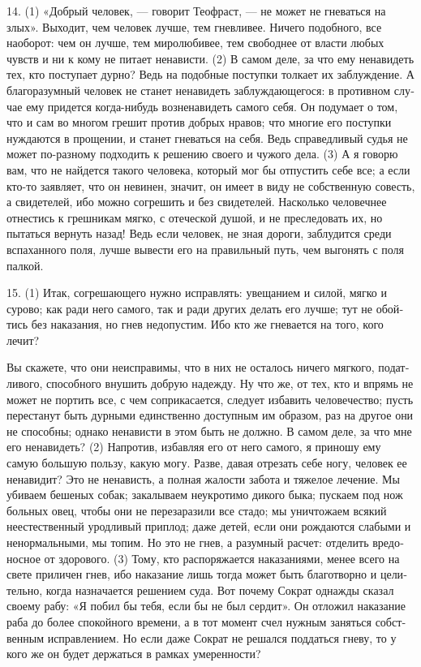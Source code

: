 14. (1) «Доб­рый чело­век, --- гово­рит Тео­фраст, --- не может не гне­вать­ся на злых». Выхо­дит, чем чело­век луч­ше, тем гнев­ли­вее. Ниче­го подоб­но­го, все наобо­рот: чем он луч­ше, тем миро­лю­би­вее, тем сво­бод­нее от вла­сти любых чувств и ни к кому не пита­ет нена­ви­сти. (2) В самом деле, за что ему нена­видеть тех, кто посту­па­ет дур­но? Ведь на подоб­ные поступ­ки тол­ка­ет их заблуж­де­ние. А бла­го­ра­зум­ный чело­век не станет нена­видеть заблуж­даю­ще­го­ся: в про­тив­ном слу­чае ему при­дет­ся когда-нибудь воз­не­на­видеть само­го себя. Он поду­ма­ет о том, что и сам во мно­гом гре­шит про­тив доб­рых нра­вов; что мно­гие его поступ­ки нуж­да­ют­ся в про­ще­нии, и станет гне­вать­ся на себя. Ведь спра­вед­ли­вый судья не может по-раз­но­му под­хо­дить к реше­нию сво­его и чужо­го дела. (3) А я гово­рю вам, что не най­дет­ся тако­го чело­ве­ка, кото­рый мог бы отпу­стить себе все; а если кто-то заяв­ля­ет, что он неви­нен, зна­чит, он име­ет в виду не соб­ст­вен­ную совесть, а свиде­те­лей, ибо мож­но согре­шить и без свиде­те­лей. Насколь­ко чело­веч­нее отне­стись к греш­ни­кам мяг­ко, с оте­че­ской душой, и не пре­сле­до­вать их, но пытать­ся вер­нуть назад! Ведь если чело­век, не зная доро­ги, заблудит­ся сре­ди вспа­хан­но­го поля, луч­ше выве­сти его на пра­виль­ный путь, чем выго­нять с поля пал­кой.

15. (1) Итак, согре­шаю­ще­го нуж­но исправ­лять: уве­ща­ни­ем и силой, мяг­ко и суро­во; как ради него само­го, так и ради дру­гих делать его луч­ше; тут не обой­тись без нака­за­ния, но гнев недо­пу­стим. Ибо кто же гне­ва­ет­ся на того, кого лечит?

Вы ска­же­те, что они неис­пра­ви­мы, что в них не оста­лось ниче­го мяг­ко­го, подат­ли­во­го, спо­соб­но­го вну­шить доб­рую надеж­ду. Ну что же, от тех, кто и впрямь не может не пор­тить все, с чем сопри­ка­са­ет­ся, сле­ду­ет изба­вить чело­ве­че­ство; пусть пере­ста­нут быть дур­ны­ми един­ст­вен­но доступ­ным им обра­зом, раз на дру­гое они не спо­соб­ны; одна­ко нена­ви­сти в этом быть не долж­но. В самом деле, за что мне его нена­видеть? (2) Напро­тив, избав­ляя его от него само­го, я при­но­шу ему самую боль­шую поль­зу, какую могу. Раз­ве, давая отре­зать себе ногу, чело­век ее нена­видит? Это не нена­висть, а пол­ная жало­сти забота и тяже­лое лече­ние. Мы уби­ва­ем беше­ных собак; зака­лы­ва­ем неукро­ти­мо дико­го быка; пус­ка­ем под нож боль­ных овец, чтобы они не пере­за­ра­зи­ли все ста­до; мы уни­что­жа­ем вся­кий неесте­ствен­ный урод­ли­вый при­плод; даже детей, если они рож­да­ют­ся сла­бы­ми и ненор­маль­ны­ми, мы топим. Но это не гнев, а разум­ный рас­чет: отде­лить вредо­нос­ное от здо­ро­во­го. (3) Тому, кто рас­по­ря­жа­ет­ся нака­за­ни­я­ми, менее все­го на све­те при­ли­чен гнев, ибо нака­за­ние лишь тогда может быть бла­готвор­но и цели­тель­но, когда назна­ча­ет­ся реше­ни­ем суда. Вот поче­му Сократ одна­жды ска­зал сво­е­му рабу: «Я побил бы тебя, если бы не был сер­дит». Он отло­жил нака­за­ние раба до более спо­кой­но­го вре­ме­ни, а в тот момент счел нуж­ным занять­ся соб­ст­вен­ным исправ­ле­ни­ем. Но если даже Сократ не решал­ся под­дать­ся гне­ву, то у кого же он будет дер­жать­ся в рам­ках уме­рен­но­сти?

